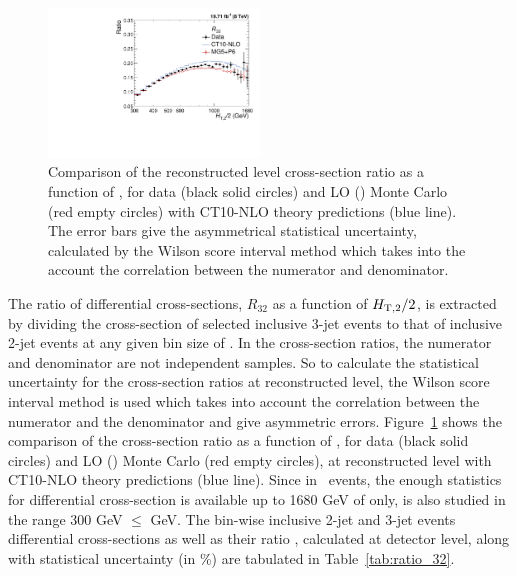 \begin{figure}[!h] 
 \begin{center}
 \hspace*{-5mm}\includegraphics[width=0.5\textwidth]{Plots_HT_2_150/Ratio_32_all_HT_2_150.pdf}
 \caption[Comparison of the cross-section ratio for data with simulated events and CT10-NLO theory predictions.]{Comparison of the reconstructed level cross-section ratio \ratio as a function of \httwons, for data (black solid circles) and LO \MadGraphFn\plusn \PYTHIAS (\MGP) Monte Carlo (red empty circles) with CT10-NLO theory predictions (blue line). The error bars give the asymmetrical statistical uncertainty, calculated by the Wilson score interval method which takes into the account the correlation between the numerator and denominator.}
 \label{fig:ratio_32}
 \end{center}
\end{figure}

The ratio of differential cross-sections, $R_{32}$ as a function of $H_{\mathrm{T,2}}/2$, is extracted by dividing the cross-section of selected inclusive 3-jet events to that of inclusive 2-jet events at any given bin size of \httwo. In the cross-section ratios, the numerator and denominator are not independent samples. So to calculate the statistical uncertainty for the cross-section ratios at reconstructed level, the Wilson score interval method is used which takes into account the correlation between the numerator and the denominator and give asymmetric errors. Figure~\ref{fig:ratio_32} shows the comparison of the cross-section ratio \ratio as a function of \httwons, for data (black solid circles) and LO \MadGraphFn\plusn \PYTHIAS (\MGP) Monte Carlo (red empty circles), at reconstructed level with CT10-NLO theory predictions (blue line). Since in \njth~events, the enough statistics for differential cross-section is available up to 1680 GeV of \httwo only, \ratio is also studied in the range 300 GeV $\leq$ \httwo {} GeV. The bin-wise inclusive 2-jet and 3-jet events differential cross-sections as well as their ratio \rations, calculated at detector level, along with statistical uncertainty (in \%) are tabulated in Table~\ref{tab:ratio_32}. 

